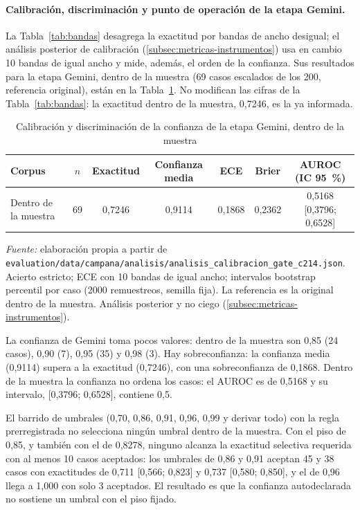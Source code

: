 \paragraph{Calibración, discriminación y punto de operación de la etapa Gemini.} La Tabla~\ref{tab:bandas} desagrega la exactitud por bandas de ancho desigual; el análisis posterior de calibración (\autoref{subsec:metricas-instrumentos}) usa en cambio 10 bandas de igual ancho y mide, además, el orden de la confianza. Sus resultados para la etapa Gemini, dentro de la muestra (69 casos escalados de los 200, referencia original), están en la Tabla~\ref{tab:calibracion-gate}. No modifican las cifras de la Tabla~\ref{tab:bandas}: la exactitud dentro de la muestra, 0,7246, es la ya informada.

\begin{table}[htbp]
\centering
\caption{Calibración y discriminación de la confianza de la etapa Gemini, dentro de la muestra}
\label{tab:calibracion-gate}
\footnotesize
\setlength{\tabcolsep}{4pt}
\begin{tabular}{@{}l c c c c c c@{}}
\toprule
\textbf{Corpus} & \textbf{\(n\)} & \textbf{Exactitud} & \textbf{Confianza media} & \textbf{ECE} & \textbf{Brier} & \textbf{AUROC (IC 95~\%)} \\
\midrule
Dentro de la muestra & 69 & 0,7246 & 0,9114 & 0,1868 & 0,2362 & 0,5168 [0,3796; 0,6528] \\
\bottomrule
\end{tabular}
\par\smallskip
{\footnotesize\textit{Fuente:} elaboración propia a partir de \texttt{evaluation/data/campana/analisis/analisis\_calibracion\_gate\_c214.json}. Acierto estricto; ECE con 10 bandas de igual ancho; intervalos bootstrap percentil por caso (2000 remuestreos, semilla fija). La referencia es la original dentro de la muestra. Análisis posterior y no ciego (\autoref{subsec:metricas-instrumentos}).\par}
\end{table}

La confianza de Gemini toma pocos valores: dentro de la muestra son 0,85 (24 casos), 0,90 (7), 0,95 (35) y 0,98 (3). Hay sobreconfianza: la confianza media (0,9114) supera a la exactitud (0,7246), con una sobreconfianza de 0,1868. Dentro de la muestra la confianza no ordena los casos: el AUROC es de 0,5168 y su intervalo, [0,3796; 0,6528], contiene 0,5.

El barrido de umbrales (0,70, 0,86, 0,91, 0,96, 0,99 y derivar todo) con la regla prerregistrada no selecciona ningún umbral dentro de la muestra. Con el piso de 0,85, y también con el de 0,8278, ninguno alcanza la exactitud selectiva requerida con al menos 10 casos aceptados: los umbrales de 0,86 y 0,91 aceptan 45 y 38 casos con exactitudes de 0,711 [0,566; 0,823] y 0,737 [0,580; 0,850], y el de 0,96 llega a 1,000 con solo 3 aceptados. El resultado es que la confianza autodeclarada no sostiene un umbral con el piso fijado.

